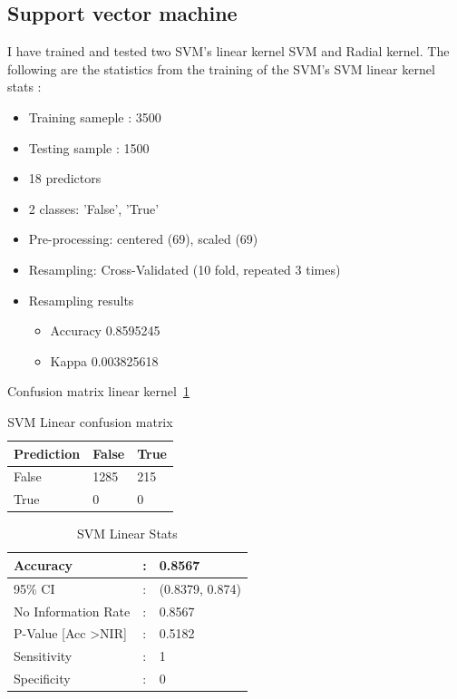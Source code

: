 \subsection{Support vector machine}
I have trained and tested two SVM's linear kernel SVM and Radial kernel. The following are the statistics from the training of the SVM's
SVM linear kernel stats :
	\begin{itemize}
		\item Training sameple : 	3500
		\item Testing sample : 1500
		\item 18 predictors
		\item 2 classes: 'False', 'True' 
		\item Pre-processing: centered (69), scaled (69) 
		\item Resampling: Cross-Validated (10 fold, repeated 3 times) 
		\item Resampling results
		\begin{itemize}
			\item Accuracy  0.8595245
			\item Kappa      0.003825618 
		\end{itemize}
	\end{itemize}
	
	Confusion matrix linear kernel~\ref{svm-l-cm}
		\begin{table}[H]
							\centering
							\caption{SVM Linear confusion matrix}
							\label{svm-l-cm}
			\begin{tabular}{lll}
				\hline
				Prediction & False & True \\
				\hline
				False & 1285 & 215 \\
				\hline
				True & 0 & 0 \\
				\hline
			\end{tabular}
		\end{table}
			\begin{table}[H]
				\centering
				\caption{SVM Linear Stats}
				\label{svm-l-stats}
				\begin{tabular}{p{5cm}p{1cm}p{5cm}}
					Accuracy  & : & 0.8567 \\
					\hline
					95\% CI   & : & (0.8379, 0.874) \\ \hline
					No Information Rate  & : & 0.8567 \\ \hline
					P-Value {[}Acc \textgreater NIR{]}  & : & 0.5182 \\ \hline
					Sensitivity  & : & 1 \\ \hline
					Specificity  & : & 0 \\ \hline
					
				\end{tabular}
			\end{table}
			
